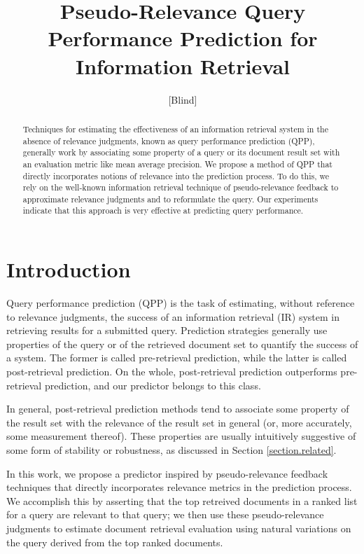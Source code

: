 \documentclass{sig-alternate}
\begin{document}
\author{[Blind]}

\title{Pseudo-Relevance Query Performance Prediction for Information Retrieval}

\maketitle
\begin{abstract}
Techniques for estimating the effectiveness of an information retrieval system in the absence of relevance judgments, known as query performance prediction (QPP), generally work by associating some property of a query or its document result set with an evaluation metric like mean average precision. We propose a method of QPP that directly incorporates notions of relevance into the prediction process. To do this, we rely on the well-known information retrieval technique of pseudo-relevance feedback to approximate relevance judgments and to reformulate the query. Our experiments indicate that this approach is very effective at predicting query performance.
\end{abstract}

\section{Introduction}\label{section.intro}

Query performance prediction (QPP) is the task of estimating, without reference to relevance judgments, the success of an information retrieval (IR) system in retrieving results for a submitted query. Prediction strategies generally use properties of the query or of the retrieved document set to quantify the success of a system. The former is called pre-retrieval prediction, while the latter is called post-retrieval prediction. On the whole, post-retrieval prediction outperforms pre-retrieval prediction, and our predictor belongs to this class.

In general, post-retrieval prediction methods tend to associate some property of the result set with the relevance of the result set in general (or, more accurately, some measurement thereof). These properties are usually intuitively suggestive of some form of stability or robustness, as discussed in Section \ref{section.related}. 

In this work, we propose a predictor inspired by pseudo-relevance feedback techniques that directly incorporates relevance metrics in the prediction process. We accomplish this by asserting that the top retreived documents in a ranked list for a query are relevant to that query; we then use these pseudo-relevance judgments to estimate document retrieval evaluation using natural variations on the query derived from the top ranked documents. 
\end{document}
